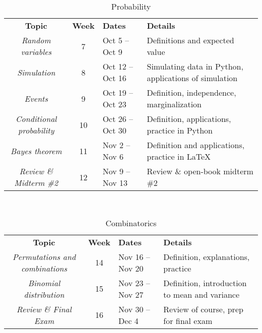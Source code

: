 \documentclass[10pt]{memoir}
\begin{document}
\begin{table}[htb!]
\centering
\begin{tabular}{ccll}
    \textbf{Topic} & \textbf{Week} & \textbf{Dates} & \textbf{Details} \\
    \cmidrule[.1em](lr){1-4}
    
   \textit{Random variables} & 7 & Oct 5 -- Oct 9 & Definitions and expected value \\
    \cmidrule[.1em](lr){1-4}
        
   \textit{Simulation} & 8 &  Oct 12 -- Oct 16 & Simulating data in Python, applications of simulation \\
    \cmidrule[.1em](lr){1-4}

   \textit{Events} & 9 & Oct 19 -- Oct 23 & Definition, independence, marginalization \\
    \cmidrule[.1em](lr){1-4}

   \textit{Conditional probability} & 10 & Oct 26 -- Oct 30  & Definition, applications, practice in Python\\
    \cmidrule[.1em](lr){1-4}   
 
    \textit{Bayes theorem } & 11 & Nov 2 -- Nov 6 & Definition and applications, practice in \LaTeX \\
    \cmidrule[.1em](lr){1-4}   
 
    \textit{Review \& Midterm  \#2} & 12 & Nov 9 -- Nov 13  & Review \& open-book midterm \#2 \\    \cmidrule[.1em](lr){1-4}     
 
\end{tabular}\\
\caption{Probability}
\end{table}

\begin{table}[htb!]
\centering
\begin{tabular}{ccll}
    \textbf{Topic} & \textbf{Week} & \textbf{Dates} & \textbf{Details} \\
    \cmidrule[.1em](lr){1-4}
    
   \textit{Permutations and combinations} & 14 & Nov 16 -- Nov 20  & Definition, explanations, practice \\
    \cmidrule[.1em](lr){1-4}
        
   \textit{Binomial distribution} & 15 & Nov 23 -- Nov 27   & Definition, introduction to mean and variance \\
    \cmidrule[.1em](lr){1-4}
 
    \textit{Review \& Final Exam } & 16 & Nov 30 -- Dec 4 & Review of course, prep for final exam \\  \cmidrule[.1em](lr){1-4}     
 
\end{tabular}\\
\caption{Combinatorics}
\end{table}
\end{document}
